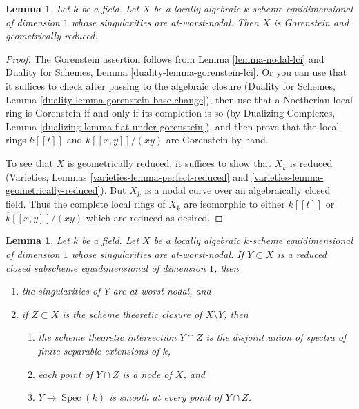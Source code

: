 \documentclass{stacks-project}
\theoremstyle{plain}
\newtheorem{lemma}[subsection]{Lemma}
\theoremstyle{definition}
\theoremstyle{remark}
\numberwithin{equation}{subsection}
\def\Spec{\mathop{\mathrm{Spec}}}
\begin{document}
\begin{lemma}
\label{lemma-facts-about-nodal-curves}
Let $k$ be a field. Let $X$ be a locally algebraic $k$-scheme
equidimensional of dimension $1$ whose singularities are at-worst-nodal.
Then $X$ is Gorenstein and geometrically reduced.
\end{lemma}

\begin{proof}
The Gorenstein assertion follows from Lemma \ref{lemma-nodal-lci}
and Duality for Schemes, Lemma \ref{duality-lemma-gorenstein-lci}.
Or you can use that it suffices to check after passing to the
algebraic closure (Duality for Schemes, Lemma
\ref{duality-lemma-gorenstein-base-change}), then use that
a Noetherian local ring is Gorenstein if and only if its
completion is so (by Dualizing Complexes, Lemma
\ref{dualizing-lemma-flat-under-gorenstein}), and
then prove that the local rings $k[[t]]$ and $k[[x, y]]/(xy)$
are Gorenstein by hand.

\medskip\noindent
To see that $X$ is geometrically reduced, it suffices to show that
$X_{\overline{k}}$ is reduced (Varieties, Lemmas
\ref{varieties-lemma-perfect-reduced} and
\ref{varieties-lemma-geometrically-reduced}).
But $X_{\overline{k}}$ is a nodal curve over an
algebraically closed field. Thus the complete local rings
of $X_{\overline{k}}$ are isomorphic to either
$\overline{k}[[t]]$ or $\overline{k}[[x, y]]/(xy)$
which are reduced as desired.
\end{proof}

\begin{lemma}
\label{lemma-closed-subscheme-nodal-curve}
Let $k$ be a field. Let $X$ be a locally algebraic $k$-scheme
equidimensional of dimension $1$ whose singularities are at-worst-nodal.
If $Y \subset X$ is a reduced closed subscheme
equidimensional of dimension $1$, then
\begin{enumerate}
\item the singularities of $Y$ are at-worst-nodal, and
\item if $Z \subset X$ is the scheme theoretic closure of
$X \setminus Y$, then
\begin{enumerate}
\item the scheme theoretic intersection $Y \cap Z$ is
the disjoint union of spectra of finite separable extensions of $k$,
\item each point of $Y \cap Z$ is a node of $X$, and
\item $Y \to \Spec(k)$ is smooth at every point of $Y \cap Z$.
\end{enumerate}
\end{enumerate}
\end{lemma}
\end{document}
